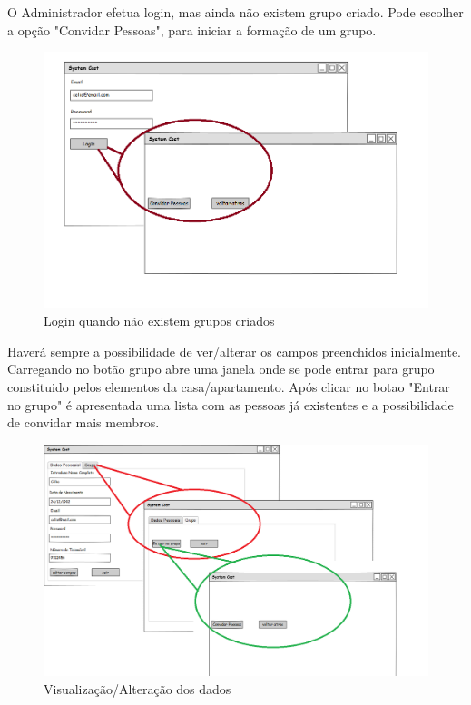 \newpage
O Administrador efetua login, mas ainda não existem grupo criado. Pode escolher a opção "Convidar Pessoas", para iniciar a formação de um grupo. 
\begin{figure}[h!]
	\centering
	\includegraphics[scale=0.5]{imagens/mockups/loginsemgrupos}  
	\caption{Login quando não existem grupos criados }  
\end{figure}


Haverá sempre a possibilidade de ver/alterar os campos preenchidos inicialmente. 
Carregando no botão grupo abre uma janela onde se pode entrar para grupo constituido pelos elementos da casa/apartamento. Após clicar no botao "Entrar no grupo" é  apresentada uma lista com as pessoas já existentes e a possibilidade de convidar mais membros. 

\begin{figure}[htb!]
	\centering
	\includegraphics[scale=0.45]{imagens/mockups/consultardados}  
	\caption{Visualização/Alteração dos dados }  
\end{figure}



